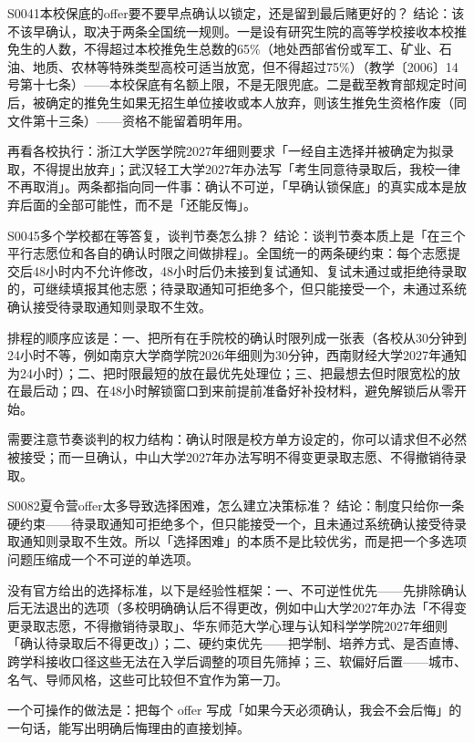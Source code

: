 \begin{qa}{S0041}{本校保底的offer要不要早点确认以锁定，还是留到最后赌更好的？}
结论：该不该早确认，取决于两条全国统一规则。一是设有研究生院的高等学校接收本校推免生的人数，不得超过本校推免生总数的65\%（地处西部省份或军工、矿业、石油、地质、农林等特殊类型高校可适当放宽，但不得超过75\%）（教学〔2006〕14号第十七条）——本校保底有名额上限，不是无限兜底。二是截至教育部规定时间后，被确定的推免生如果无招生单位接收或本人放弃，则该生推免生资格作废（同文件第十三条）——资格不能留着明年用。

再看各校执行：浙江大学医学院2027年细则要求「一经自主选择并被确定为拟录取，不得提出放弃」；武汉轻工大学2027年办法写「考生同意待录取后，我校一律不再取消」。两条都指向同一件事：确认不可逆，「早确认锁保底」的真实成本是放弃后面的全部可能性，而不是「还能反悔」。
\end{qa}

\begin{qa}{S0045}{多个学校都在等答复，谈判节奏怎么排？}
结论：谈判节奏本质上是「在三个平行志愿位和各自的确认时限之间做排程」。全国统一的两条硬约束：每个志愿提交后48小时内不允许修改，48小时后仍未接到复试通知、复试未通过或拒绝待录取的，可继续填报其他志愿；待录取通知可拒绝多个，但只能接受一个，未通过系统确认接受待录取通知则录取不生效。

排程的顺序应该是：一、把所有在手院校的确认时限列成一张表（各校从30分钟到24小时不等，例如南京大学商学院2026年细则为30分钟，西南财经大学2027年通知为24小时）；二、把时限最短的放在最优先处理位；三、把最想去但时限宽松的放在最后动；四、在48小时解锁窗口到来前提前准备好补投材料，避免解锁后从零开始。

需要注意节奏谈判的权力结构：确认时限是校方单方设定的，你可以请求但不必然被接受；而一旦确认，中山大学2027年办法写明不得变更录取志愿、不得撤销待录取。
\end{qa}

\begin{qa}{S0082}{夏令营offer太多导致选择困难，怎么建立决策标准？}
结论：制度只给你一条硬约束——待录取通知可拒绝多个，但只能接受一个，且未通过系统确认接受待录取通知则录取不生效。所以「选择困难」的本质不是比较优劣，而是把一个多选项问题压缩成一个不可逆的单选项。

没有官方给出的选择标准，以下是经验性框架：一、不可逆性优先——先排除确认后无法退出的选项（多校明确确认后不得更改，例如中山大学2027年办法「不得变更录取志愿，不得撤销待录取」、华东师范大学心理与认知科学学院2027年细则「确认待录取后不得更改」）；二、硬约束优先——把学制、培养方式、是否直博、跨学科接收口径这些无法在入学后调整的项目先筛掉；三、软偏好后置——城市、名气、导师风格，这些可比较但不宜作为第一刀。

一个可操作的做法是：把每个 offer 写成「如果今天必须确认，我会不会后悔」的一句话，能写出明确后悔理由的直接划掉。
\end{qa}

